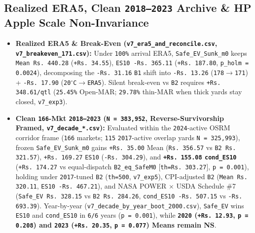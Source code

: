 \documentclass[11pt,a4paper]{article}
\begin{document}
\subsection{Realized ERA5, Clean \texttt{2018--2023} Archive \& HP Apple Scale Non-Invariance}

\begin{itemize}
  \item \textbf{Realized ERA5 \& Break-Even (\texttt{v7\_era5\_and\_reconcile.csv}, \texttt{v7\_breakeven\_171.csv}):} Under \texttt{100\%} arrival ERA5, \texttt{Safe\_EV\_Sunk\_m0} keeps \texttt{Mean Rs.\,440.28} (\texttt{+Rs.\,34.55}), \texttt{ES10 -Rs.\,365.11} (\texttt{+Rs.\,187.80}, \texttt{p\_holm = 0.0024}), decomposing the \texttt{-Rs.\,31.16} \texttt{B1} shift into \texttt{-Rs.\,13.26} (\texttt{178$\to$171}) + \texttt{-Rs.\,17.90} (\texttt{20$^\circ$C$\to$ERA5}). Silent break-even vs \texttt{B2} requires \texttt{+Rs.\,348.61/qtl} (\texttt{25.45\%} Open-MAR; \texttt{29.78\%} thin-MAR when thick yards stay closed, \texttt{v7\_exp3}).
  \item \textbf{Clean \texttt{166}-Mkt \texttt{2018--2023} (\texttt{N = 383,952}, Reverse-Survivorship Framed, \texttt{v7\_decade\_*.csv}):} Evaluated within the \texttt{2024}-active OSRM corridor frame (\texttt{166} markets; \texttt{115} \texttt{2017}-active overlap yards \texttt{N = 325,993}), frozen \texttt{Safe\_EV\_Sunk\_m0} gains \texttt{+Rs.\,35.00} Mean (\texttt{Rs.\,356.57} vs \texttt{B2 Rs.\,321.57}), \texttt{+Rs.\,169.27} \texttt{ES10} (\texttt{-Rs.\,304.29}), and \textbf{\texttt{+Rs.\,155.08} \texttt{cond\_ES10}} (\texttt{+Rs.\,174.27} vs equal-dispatch \texttt{B2\_eq\_SafeM0} [\texttt{th=Rs.\,303.27}], \texttt{p = 0.001}), holding under \texttt{2017}-tuned \texttt{B2} (\texttt{th=500}, \texttt{v7\_exp5}), CPI-adjusted \texttt{B2} (\texttt{Mean Rs.\,320.11}, \texttt{ES10 -Rs.\,467.21}), and NASA POWER $\times$ USDA Schedule \#7 (\texttt{Safe\_EV Rs.\,328.15} vs \texttt{B2 Rs.\,284.26}, \texttt{cond\_ES10 -Rs.\,507.15} vs \texttt{-Rs.\,693.39}). Year-by-year (\texttt{v7\_decade\_by\_year\_boot\_2000.csv}), \texttt{Safe\_EV} wins \texttt{ES10} and \texttt{cond\_ES10} in \texttt{6/6} years (\texttt{p = 0.001}), while \textbf{\texttt{2020} (\texttt{+Rs.\,12.93}, \texttt{p = 0.208}) and \texttt{2023} (\texttt{+Rs.\,20.35}, \texttt{p = 0.077}) Means remain NS}.

\end{itemize}
\end{document}

